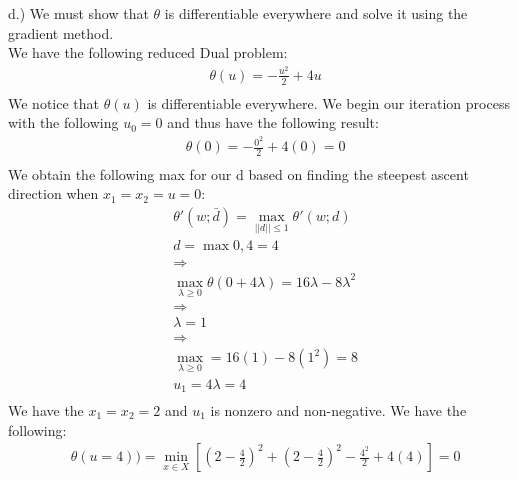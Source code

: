 \documentclass[12pt]{article}
\begin{document}
    d.) We must show that $\theta$ is differentiable everywhere and solve it using the gradient method.\\
    We have the following reduced Dual problem:\\
        \begin{align*}
            &\theta(u) = -\frac{u^2}{2} + 4u\\
        \end{align*}
    We notice that $\theta(u)$ is differentiable everywhere. We begin our iteration process with the following $u_0 = 0$ and thus have the following result: \\
        \begin{align*}
            &\theta(0) = -\frac{0^2}{2} + 4(0) = 0\\
        \end{align*}
    We obtain the following max for our d based on finding the steepest ascent direction when $x_1 = x_2 = u = 0$:\\
        \begin{align*}
            &\theta'(w; \bar d) = \max_{||d|| \leq 1}\theta'(w;d)\\
            &d = \max{0,4} = 4\\
            &\Rightarrow\\
            &\max_{\lambda \geq 0} \theta(0+4\lambda) = 16\lambda -8\lambda^2\\
            &\Rightarrow\\
            &\lambda = 1\\
            &\Rightarrow\\
            &\max_{\lambda \geq 0} = 16(1) - 8(1^2) = 8\\
            &u_1=4\lambda = 4\\
        \end{align*}
    We have the $x_1 = x_2 = 2$ and $u_1 $ is nonzero and non-negative. We have the following:\\
        \begin{align*}
            &\theta (u=4)) = \min_{x \in X} [(2 - \frac{4}{2})^2 + (2 - \frac{4}{2})^2 - \frac{4^2}{2} + 4(4)]=0\\
        \end{align*}
\end{document}
